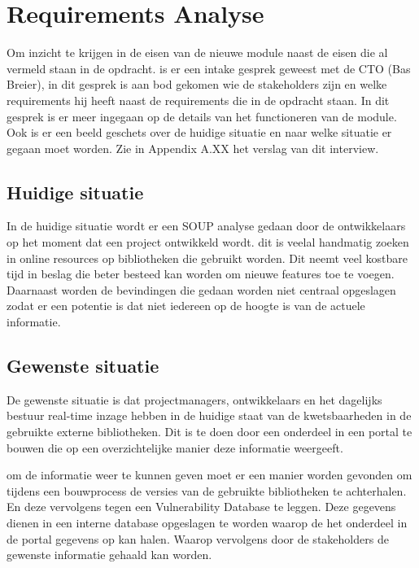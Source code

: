 
\chapter{Requirements Analyse} %

\label{requirementsAnalyse} %
Om inzicht te krijgen in de eisen van de nieuwe module naast de eisen die al vermeld staan in de opdracht. is er een intake gesprek geweest met de CTO (Bas Breier), in dit gesprek is aan bod gekomen wie de stakeholders zijn en welke requirements hij heeft naast de requirements die in de opdracht staan. In dit gesprek is er meer ingegaan op de details van het functioneren van de module. Ook is er een beeld geschets over de huidige situatie en naar welke situatie er gegaan moet worden. %
Zie in Appendix A.XX het verslag van dit interview.


\section{Huidige situatie}
In de huidige situatie wordt er een SOUP analyse gedaan door de ontwikkelaars op het moment dat een project ontwikkeld wordt. dit is veelal handmatig zoeken in online resources op bibliotheken die gebruikt worden. Dit neemt veel kostbare tijd in beslag die beter besteed kan worden om nieuwe features toe te voegen. Daarnaast worden de bevindingen die gedaan worden niet centraal opgeslagen zodat er een potentie is dat niet iedereen op de hoogte is van de actuele informatie.

\section{Gewenste situatie}
De gewenste situatie is dat projectmanagers, ontwikkelaars en het dagelijks bestuur real-time inzage hebben in de huidige staat van de kwetsbaarheden in de gebruikte externe bibliotheken. Dit is te doen door een onderdeel in een portal te bouwen die op een overzichtelijke manier deze informatie weergeeft.

om de informatie weer te kunnen geven moet er een manier worden gevonden om tijdens een bouwprocess de versies van de gebruikte bibliotheken te achterhalen. En deze vervolgens tegen een Vulnerability Database te leggen. Deze gegevens dienen in een interne database opgeslagen te worden waarop de het onderdeel in de portal gegevens op kan halen. Waarop vervolgens door de stakeholders de gewenste informatie gehaald kan worden.

